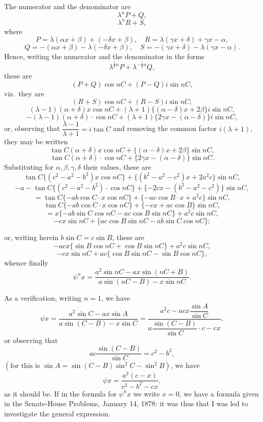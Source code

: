 \documentclass[11pt,a4paper]{article}
\begin{document}
The numerator and the denominator are
\[
\lambda^{n}P + Q,
\]
\[
\lambda^{n}R + S,
\]
where
\[
P = \lambda(\alpha x + \beta) + (-\delta x + \beta),\quad R = \lambda(\gamma x + \delta) + \gamma x - \alpha,
\]
\[
Q = -(\alpha x + \beta) - \lambda(-\delta x + \beta),\quad S = -(\gamma x + \delta) - \lambda(\gamma x - \alpha).
\]
Hence, writing the numerator and the denominator in the forms
\[
\lambda^{\frac{1}{2}n}P + \lambda^{-\frac{1}{2}n}Q,
\]
these are
\[
(P + Q)\cos nC + (P - Q)i\sin nC,
\]
viz.\ they are
\[
(R + S)\cos nC + (R - S)i\sin nC;
\]
\[
(\lambda - 1)(\alpha + \delta)x\cos nC + (\lambda + 1)\{(\alpha - \delta)x + 2\beta\}i\sin nC,
\]
\[
-(\lambda - 1)(\alpha + \delta)\cdot\cos nC + (\lambda + 1)\{2\gamma x - (\alpha - \delta)\}i\sin nC,
\]
or, observing that $\dfrac{\lambda - 1}{\lambda + 1} = i\tan C$ and removing the common factor $i(\lambda + 1)$, they may be written
\[
\tan C(\alpha + \delta)x\cos nC + \{(\alpha - \delta)x + 2\beta\}\sin nC,
\]
\[
\tan C(\alpha + \delta)\cdot\cos nC + \{2\gamma x - (\alpha - \delta)\}\sin nC.
\]
Substituting for $\alpha, \beta, \gamma, \delta$ their values, these are
\[
\tan C\{(c^{2} - a^{2} - b^{2})x\cos nC\} + \{(b^{2} - a^{2} - c^{2})x + 2a^{2}c\}\sin nC,
\]
\[
-a - \tan C\{(c^{2} - a^{2} - b^{2})\cdot\cos nC\} + \{-2cx - (b^{2} - a^{2} - c^{2})\}\sin nC,
\]
\[
= \tan C\{-ab\cos C\cdot x\cos nC\} + \{-ac\cos B\cdot x + a^{2}c\}\sin nC,
\]
\[
\tan C\{-ab\cos C\cdot x\cos nC\} + \{-cx + ac\cos B\}\sin nC,
\]
\[
= x\{-ab\sin C\cos nC - ac\cos B\sin nC\} + a^{2}c\sin nC,
\]
\[
-cx\sin nC + \{ac\cos B\sin nC - ab\sin C\cos nC\};
\]

\newpage


or, writing herein $b\sin C = c\sin B$, these are
\[
-acx\{\sin B\cos nC + \cos B\sin nC\} + a^{2}c\sin nC,
\]
\[
-cx\sin nC + ac\{\cos B\sin nC - \sin B\cos nC\},
\]
whence finally
\[
\psi^{n}x = \frac{a^{2}\sin nC - ax\sin(nC + B)}{a\sin(nC - B) - x\sin nC}.
\]

As a verification, writing $n = 1$, we have
\[
\psi x = \frac{a^{2}\sin C - ax\sin A}{a\sin(C - B) - x\sin C} = \frac{a^{2}c - acx\dfrac{\sin A}{\sin C}}{a\dfrac{\sin(C - B)}{\sin C}\cdot c - cx},
\]
or observing that
\[
ac\frac{\sin(C - B)}{\sin C} = c^{2} - b^{2},
\]
$\left(\text{for this is } \sin A = \sin(C - B)\sin^{2}C - \sin^{2}B\right)$, we have
\[
\psi x = \frac{a^{2}(c - x)}{c^{2} - b^{2} - cx},
\]
as it should be. If in the formula for $\psi^{n}x$ we write $x = 0$, we have a formula given in the Senate-House Problems, January 14, 1878: it was thus that I was led to investigate the general expression.
\end{document}
